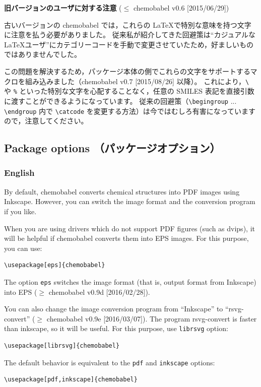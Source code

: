 \documentclass[12pt]{jsarticle}
\begin{document}
\noindent \textbf{旧バージョンのユーザに対する注意} ($\le$ \textsf{chemobabel} v0.6 [2015/06/29])

古いバージョンの \textsf{chemobabel} では，これらの \LaTeX で特別な意味を持つ文字に注意を払う必要がありました。
従来私が紹介してきた回避策は“カジュアルな \LaTeX ユーザ”にカテゴリーコードを手動で変更させていたため，好ましいものではありませんでした。

この問題を解決するため，パッケージ本体の側でこれらの文字をサポートするマクロを組み込みました（\textsf{chemobabel} v0.7 [2015/08/26] 以降）。
これにより，\verb|\| や \verb|%| といった特別な文字を心配することなく，任意の SMILES 表記を直接引数に渡すことができるようになっています。
従来の回避策（\verb|\begingroup| ... \verb|\endgroup| 内で \verb|\catcode| を変更する方法）は今ではむしろ有害になっていますので，注意してください。

\clearpage

\subsection{Package options （パッケージオプション）}

\subsubsection{English}

By default, \textsf{chemobabel} converts chemical structures into PDF images using Inkscape.
However, you can switch the image format and the conversion program if you like.

When you are using drivers which do not support PDF figures (such as dvips), it will be helpful if \textsf{chemobabel} converts them into EPS images.
For this purpose, you can use:
\begin{verbatim}
\usepackage[eps]{chemobabel}
\end{verbatim}
The option \verb|eps| switches the image format (that is, output format from Inkscape) into EPS ($\ge$ \textsf{chemobabel} v0.9d [2016/02/28]).

You can also change the image conversion program from ``Inkscape'' to ``rsvg-convert'' ($\ge$ \textsf{chemobabel} v0.9e [2016/03/07]).
The program rsvg-convert is faster than inkscape, so it will be useful.
For this purpose, use \verb|librsvg| option:
\begin{verbatim}
\usepackage[librsvg]{chemobabel}
\end{verbatim}

The default behavior is equivalent to the \verb|pdf| and \verb|inkscape| options:
\begin{verbatim}
\usepackage[pdf,inkscape]{chemobabel}
\end{verbatim}
\end{document}
